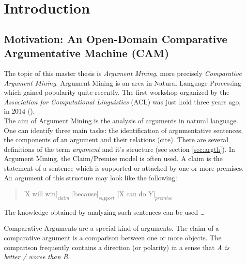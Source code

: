 \chapter{Introduction}

\section{Motivation: An Open-Domain Comparative Argumentative Machine (CAM)}

The topic of this master thesis is \emph{Argument Mining}, more precisely \emph{Comparative Argument Mining}. Argument Mining is an area in Natural Language Processing which gained popularity quite recently. The first workshop organized by the \emph{Association for Computational Linguistics} (ACL) was just hold three years ago, in 2014 (\cite{W14-21:2014}).\\
The aim of Argument Mining is the analysis of arguments in natural language. One can identify three main tasks: the identification of argumentative sentences, the components of an argument and their relations (cite). There are several definitions of the term \emph{argument} and it's structure (see section \ref{sec:argth}). In Argument Mining, the Claim/Premise model is often used. A claim is the statement of a sentence which is supported or attacked by one or more premises. An argument of this structure may look like the following:
\begin{quote}
    [X will win$]_{claim}$ [because$]_{support}$ [X can do Y$]_{premise}$
\end{quote}
The knowledge obtained by analyzing such sentences can be used \ldots\newline

Comparative Arguments are a special kind of arguments. The claim of a comparative argument is a comparison between one or more objects. The comparison frequently contains a direction (or polarity) in a sense that \emph{A is better / worse than B}.



